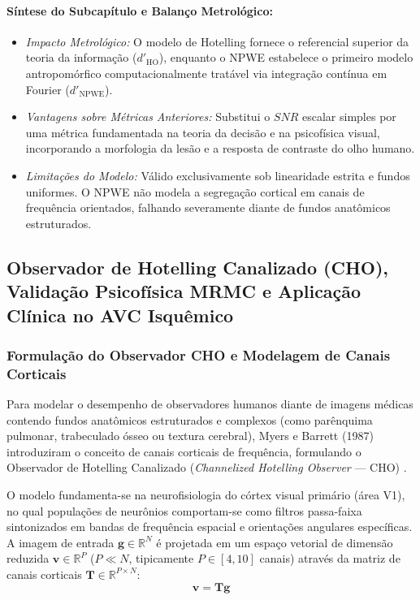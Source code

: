 \documentclass[
  12pt,
  a4paper,
  oneside
]{report}
\begin{document}
\paragraph{Síntese do Subcapítulo e Balanço Metrológico:}
\begin{itemize}
  \item \emph{Impacto Metrológico:} O modelo de Hotelling fornece o referencial superior da teoria da informação ($d'_{\text{HO}}$), enquanto o NPWE estabelece o primeiro modelo antropomórfico computacionalmente tratável via integração contínua em Fourier ($d'_{\text{NPWE}}$).
  \item \emph{Vantagens sobre Métricas Anteriores:} Substitui o $SNR$ escalar simples por uma métrica fundamentada na teoria da decisão e na psicofísica visual, incorporando a morfologia da lesão e a resposta de contraste do olho humano.
  \item \emph{Limitações do Modelo:} Válido exclusivamente sob linearidade estrita e fundos uniformes. O NPWE não modela a segregação cortical em canais de frequência orientados, falhando severamente diante de fundos anatômicos estruturados.
\end{itemize}

\subsection{Observador de Hotelling Canalizado (CHO), Validação Psicofísica MRMC e Aplicação Clínica no AVC Isquêmico}
\label{subsec:cho_mrmc_avc_isquemico_consolidado}

\subsubsection{Formulação do Observador CHO e Modelagem de Canais Corticais}
Para modelar o desempenho de observadores humanos diante de imagens médicas contendo fundos anatômicos estruturados e complexos (como parênquima pulmonar, trabeculado ósseo ou textura cerebral), Myers e Barrett (1987) introduziram o conceito de canais corticais de frequência, formulando o Observador de Hotelling Canalizado (\emph{Channelized Hotelling Observer} --- CHO) \cite{myers_barrett_1987, gallas2003}.

O modelo fundamenta-se na neurofisiologia do córtex visual primário (área V1), no qual populações de neurônios comportam-se como filtros passa-faixa sintonizados em bandas de frequência espacial e orientações angulares específicas. A imagem de entrada $\mathbf{g} \in \mathbb{R}^N$ é projetada em um espaço vetorial de dimensão reduzida $\mathbf{v} \in \mathbb{R}^P$ ($P \ll N$, tipicamente $P \in [4, 10]$ canais) através da matriz de canais corticais $\mathbf{T} \in \mathbb{R}^{P \times N}$:
\begin{equation}
  \mathbf{v} = \mathbf{T} \mathbf{g}
  \label{eq:cho_projecao_v}
\end{equation}
\end{document}
